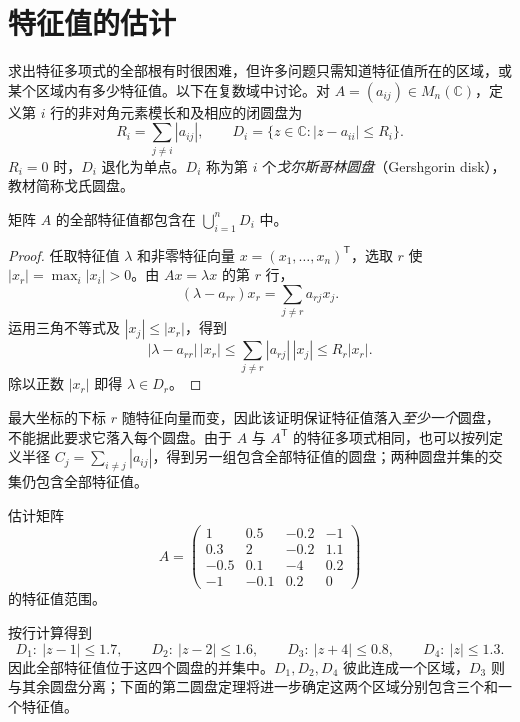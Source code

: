 \section{特征值的估计}
\label{sec:xie-gershgorin}

求出特征多项式的全部根有时很困难，但许多问题只需知道特征值所在的区域，或某个区域内有多少特征值。以下在复数域中讨论。对 $A=(a_{ij})\in M_n(\mathbb C)$，定义第 $i$ 行的非对角元素模长和及相应的闭圆盘为
\begin{equation}
\label{eq:xie-gershgorin-disks}
 R_i=\sum_{j\ne i}|a_{ij}|,
 \qquad D_i=\{z\in\mathbb C:|z-a_{ii}|\leq R_i\}.
\end{equation}
$R_i=0$ 时，$D_i$ 退化为单点。$D_i$ 称为第 $i$ 个\emph{戈尔斯哥林圆盘}（Gershgorin disk），教材简称戈氏圆盘。

\begin{theorem}
\label{thm:xie-gershgorin-first}
矩阵 $A$ 的全部特征值都包含在 $\bigcup_{i=1}^nD_i$ 中。
\end{theorem}
\begin{proof}
任取特征值 $\lambda$ 和非零特征向量 $x=(x_1,\ldots,x_n)^{\mathsf T}$，选取 $r$ 使 $|x_r|=\max_i|x_i|>0$。由 $Ax=\lambda x$ 的第 $r$ 行，
\[
 (\lambda-a_{rr})x_r=\sum_{j\ne r}a_{rj}x_j.
\]
运用三角不等式及 $|x_j|\leq|x_r|$，得到
\[
 |\lambda-a_{rr}|\,|x_r|
 \leq\sum_{j\ne r}|a_{rj}|\,|x_j|
 \leq R_r|x_r|.
\]
除以正数 $|x_r|$ 即得 $\lambda\in D_r$。
\end{proof}

最大坐标的下标 $r$ 随特征向量而变，因此该证明保证特征值落入\emph{至少一个}圆盘，不能据此要求它落入每个圆盘。由于 $A$ 与 $A^{\mathsf T}$ 的特征多项式相同，也可以按列定义半径 $C_j=\sum_{i\ne j}|a_{ij}|$，得到另一组包含全部特征值的圆盘；两种圆盘并集的交集仍包含全部特征值。

\begin{example}
\label{ex:xie-gershgorin-four}
估计矩阵
\[
 A=\begin{pmatrix}
 1&0.5&-0.2&-1\\
 0.3&2&-0.2&1.1\\
 -0.5&0.1&-4&0.2\\
 -1&-0.1&0.2&0
 \end{pmatrix}
\]
的特征值范围。
\end{example}
\begin{solve}
按行计算得到
\[
 D_1:\ |z-1|\leq1.7,\qquad D_2:\ |z-2|\leq1.6,
 \qquad D_3:\ |z+4|\leq0.8,\qquad D_4:\ |z|\leq1.3.
\]
因此全部特征值位于这四个圆盘的并集中。$D_1,D_2,D_4$ 彼此连成一个区域，$D_3$ 则与其余圆盘分离；下面的第二圆盘定理将进一步确定这两个区域分别包含三个和一个特征值。
\end{solve}

